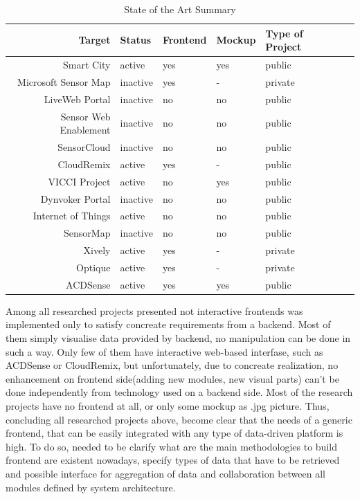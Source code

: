     \begin{table}[H]
	\centering
	\begin{tabular}{|r|l|l|l|l|l|}
	\hline
	Target 			       & Status & Frontend & Mockup & Type of Project \\
	\hline 
	\hline
	Smart City		       & active & yes & yes & public \\
	\hline
	Microsoft Sensor Map   & inactive & yes & - & private \\
	\hline
	LiveWeb Portal	       & inactive & no & no & public \\
	\hline
	Sensor Web Enablement  & inactive & no & no & public \\
	\hline
	SensorCloud		       & inactive & no & no & public \\
	\hline
	CloudRemix		       & active & yes & - & public \\
	\hline
	VICCI Project		   & active & no & yes & public \\
	\hline
	Dynvoker Portal		   & inactive & no & no & public \\
	\hline
	Internet of Things	   & active & no & no & public \\
	\hline
	SensorMap              & inactive & no & no & public \\
	\hline
	Xively                 & active & yes & - & private \\
	\hline
	Optique                & active & yes & - & private \\
	\hline
	ACDSense               & active & yes & yes & public \\
	\hline
	\end{tabular}
	\caption[State of the Art]{State of the Art Summary}
	\label{tab:state_of_the_art}
	\end{table}

Among all researched projects presented not interactive frontends was implemented only to satisfy concreate requirements from a backend. Most of them simply visualise data provided by backend, no manipulation can be done in such a way. Only few of them have interactive web-based interfase, such as ACDSense or CloudRemix, but unfortunately, due to concreate realization, no enhancement on frontend side(adding new modules, new visual parts) can't be done independently from technology used on a backend side. Most of the research projects have no frontend at all, or only some mockup as .jpg picture. Thus, concluding all researched projects above, become clear that the needs of a generic frontend, that can be easily integrated with any type of data-driven platform is high. To do so, needed to be clarify what are the main methodologies to build frontend are existent nowadays, specify types of data that have to be retrieved and possible interface for aggregation of data and collaboration between all modules defined by system architecture.

